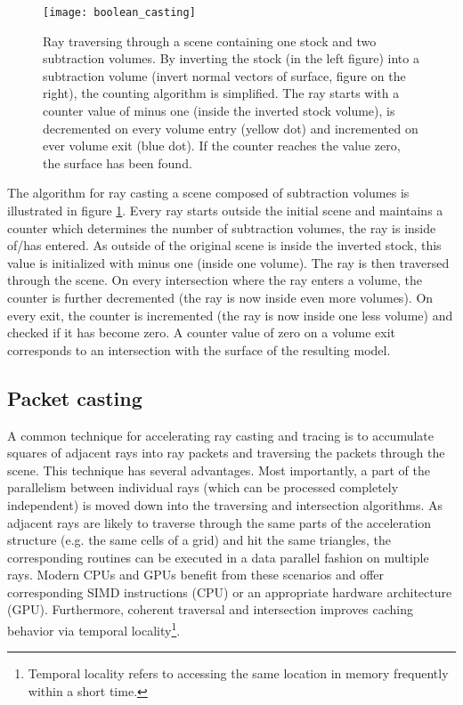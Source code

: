\begin{figure}
\centering
\texttt{[image: boolean\_casting]}
\caption{Ray traversing through a scene containing one stock and two subtraction volumes. By inverting the stock (in the left figure) into a subtraction volume (invert normal vectors of surface, figure on the right), the counting algorithm is simplified. The ray starts with a counter value of minus one (inside the inverted stock volume), is decremented on every volume entry (yellow dot) and incremented on ever volume exit (blue dot). If the counter reaches the value zero, the surface has been found.}
\label{fig:boolean_casting} 
\end{figure}

The algorithm for ray casting a scene composed of subtraction volumes is illustrated in figure \ref{fig:boolean_casting}. Every ray starts outside the initial scene and maintains a counter which determines the number of subtraction volumes, the ray is inside of/has entered. As outside of the original scene is inside the inverted stock, this value is initialized with minus one (inside one volume). The ray is then traversed through the scene. On every intersection where the ray enters a volume, the counter is further decremented (the ray is now inside even more volumes). On every exit, the counter is incremented (the ray is now inside one less volume) and checked if it has become zero. A counter value of zero on a volume exit corresponds to an intersection with the surface of the resulting model.

\subsection{Packet casting}
\label{sec:packet_casting}

A common technique for accelerating ray casting and tracing is to accumulate squares of adjacent rays into ray packets and traversing the packets through the scene. This technique has several advantages. Most importantly, a part of the parallelism between individual rays (which can be processed completely independent) is moved down into the traversing and intersection algorithms. As adjacent rays are likely to traverse through the same parts of the acceleration structure (e.g. the same cells of a grid) and hit the same triangles, the corresponding routines can be executed in a data parallel fashion on multiple rays. Modern CPUs and GPUs benefit from these scenarios and offer corresponding SIMD instructions (CPU) or an appropriate hardware architecture (GPU). Furthermore, coherent traversal and intersection improves caching behavior via temporal locality\footnote{Temporal locality refers to accessing the same location in memory frequently within a short time.}.

